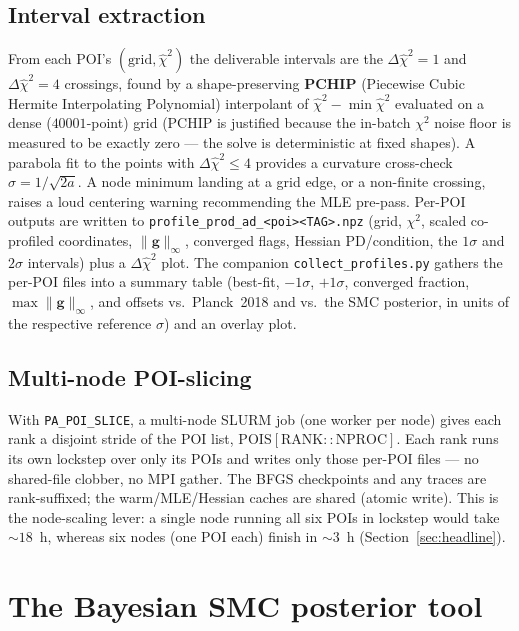 \documentclass[11pt]{article}
\newcommand{\code}[1]{\texttt{\small #1}}
\newcommand{\file}[1]{\texttt{\small #1}}
\newcommand{\chisq}{\chi^2}
\newcommand{\dchisq}{\Delta\hat\chi^2}
\newcommand{\ginf}{\lVert \bm{g}\rVert_\infty}
\begin{document}
\subsection{Interval extraction}
\label{sec:intervals}

From each POI's $(\mathrm{grid},\hat\chisq)$ the deliverable intervals are
the $\dchisq=1$ and $\dchisq=4$ crossings, found by a shape-preserving
\textbf{PCHIP} (Piecewise Cubic Hermite Interpolating Polynomial)
interpolant of $\hat\chisq-\min\hat\chisq$
evaluated on a dense ($40001$-point) grid (PCHIP is justified because the
in-batch $\chisq$ noise floor is measured to be exactly zero --- the
solve is deterministic at fixed shapes). A parabola fit to the points with
$\dchisq\le4$ provides a curvature cross-check
$\sigma=1/\sqrt{2a}$. A node minimum landing at a grid edge, or a
non-finite crossing, raises a loud centering warning recommending the MLE
pre-pass. Per-POI outputs are written to
\file{profile\_prod\_ad\_<poi><TAG>.npz} (grid, $\chisq$, scaled
co-profiled coordinates, $\ginf$, converged flags, Hessian PD/condition,
the $1\sigma$ and $2\sigma$ intervals) plus a $\dchisq$ plot. The
companion \file{collect\_profiles.py} gathers the per-POI files into a
summary table (best-fit, $-1\sigma$, $+1\sigma$, converged fraction,
$\max\ginf$, and offsets vs.\ Planck~2018 and vs.\ the SMC posterior, in
units of the respective reference $\sigma$) and an overlay plot.

\subsection{Multi-node POI-slicing}
\label{sec:poislice}

With \code{PA\_POI\_SLICE}, a multi-node SLURM job (one worker per node)
gives each rank a disjoint stride of the POI list,
$\mathrm{POIS[RANK::NPROC]}$. Each rank runs its own lockstep over only
its POIs and writes only those per-POI files --- no shared-file clobber,
no MPI gather. The BFGS checkpoints and any traces are rank-suffixed; the
warm/MLE/Hessian caches are shared (atomic write). This is the
node-scaling lever: a single node running all six POIs in lockstep would
take $\sim18$~h, whereas six nodes (one POI each) finish in $\sim3$~h
(Section~\ref{sec:headline}).

\section{The Bayesian SMC posterior tool}
\label{sec:smc}
\end{document}
